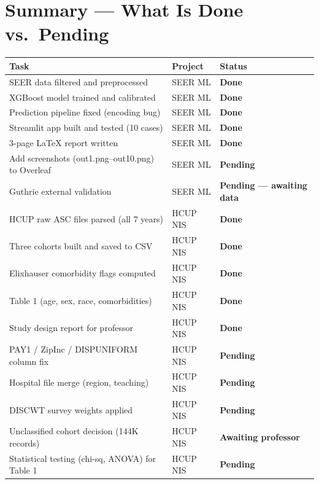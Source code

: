 \documentclass[11pt,letterpaper]{article}
\begin{document}
\newpage

\section{Summary — What Is Done vs.\ Pending}

\begin{center}
\renewcommand{\arraystretch}{1.4}
\begin{tabularx}{\textwidth}{Xll}
\toprule
\textbf{Task} & \textbf{Project} & \textbf{Status} \\
\midrule
SEER data filtered and preprocessed          & SEER ML  & \textcolor{projgreen}{\textbf{Done}} \\
XGBoost model trained and calibrated         & SEER ML  & \textcolor{projgreen}{\textbf{Done}} \\
Prediction pipeline fixed (encoding bug)     & SEER ML  & \textcolor{projgreen}{\textbf{Done}} \\
Streamlit app built and tested (10 cases)    & SEER ML  & \textcolor{projgreen}{\textbf{Done}} \\
3-page LaTeX report written                  & SEER ML  & \textcolor{projgreen}{\textbf{Done}} \\
Add screenshots (out1.png–out10.png) to Overleaf & SEER ML & \textcolor{warnred}{\textbf{Pending}} \\
Guthrie external validation                  & SEER ML  & \textcolor{warnred}{\textbf{Pending — awaiting data}} \\
\midrule
HCUP raw ASC files parsed (all 7 years)      & HCUP NIS & \textcolor{projgreen}{\textbf{Done}} \\
Three cohorts built and saved to CSV         & HCUP NIS & \textcolor{projgreen}{\textbf{Done}} \\
Elixhauser comorbidity flags computed        & HCUP NIS & \textcolor{projgreen}{\textbf{Done}} \\
Table 1 (age, sex, race, comorbidities)      & HCUP NIS & \textcolor{projgreen}{\textbf{Done}} \\
Study design report for professor            & HCUP NIS & \textcolor{projgreen}{\textbf{Done}} \\
PAY1 / ZipInc / DISPUNIFORM column fix      & HCUP NIS & \textcolor{warnred}{\textbf{Pending}} \\
Hospital file merge (region, teaching)       & HCUP NIS & \textcolor{warnred}{\textbf{Pending}} \\
DISCWT survey weights applied               & HCUP NIS & \textcolor{warnred}{\textbf{Pending}} \\
Unclassified cohort decision (144K records)  & HCUP NIS & \textcolor{warnred}{\textbf{Awaiting professor}} \\
Statistical testing (chi-sq, ANOVA) for Table 1 & HCUP NIS & \textcolor{warnred}{\textbf{Pending}} \\
\bottomrule
\end{tabularx}
\end{center}
\end{document}
